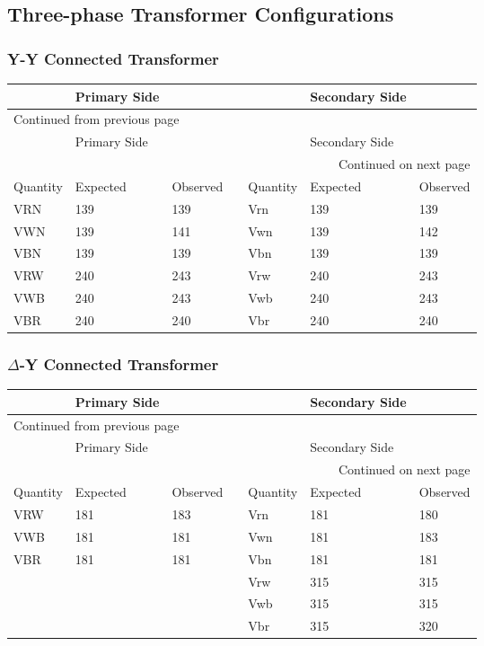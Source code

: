 \documentclass[11pt]{article}
\begin{document}
\subsection{Three-phase Transformer Configurations}
\label{sec:org8ccf199}
\subsubsection{Y-Y Connected Transformer}
\label{sec:org88b83c5}
\begin{longtable}{|l|l|l|l|l|l|l|}
\hline
 & Primary Side &  &  &  & Secondary Side & \\
\hline
\endfirsthead
\multicolumn{7}{l}{Continued from previous page} \\
\hline

 & Primary Side &  &  &  & Secondary Side &  \\

\hline
\endhead
\hline\multicolumn{7}{r}{Continued on next page} \\
\endfoot
\endlastfoot
\hline
Quantity & Expected & Observed &  & Quantity & Expected & Observed\\
\hline
VRN & 139 & 139 &  & Vrn & 139 & 139\\
\hline
VWN & 139 & 141 &  & Vwn & 139 & 142\\
\hline
VBN & 139 & 139 &  & Vbn & 139 & 139\\
\hline
VRW & 240 & 243 &  & Vrw & 240 & 243\\
\hline
VWB & 240 & 243 &  & Vwb & 240 & 243\\
VBR & 240 & 240 &  & Vbr & 240 & 240\\
\hline
\end{longtable}
\subsubsection{\(\Delta\)-Y Connected Transformer}
\label{sec:org7fd7304}
\begin{longtable}{|l|l|l|l|l|l|l|}
\hline
 & Primary Side &  &  &  & Secondary Side & \\
\hline
\endfirsthead
\multicolumn{7}{l}{Continued from previous page} \\
\hline

 & Primary Side &  &  &  & Secondary Side &  \\

\hline
\endhead
\hline\multicolumn{7}{r}{Continued on next page} \\
\endfoot
\endlastfoot
\hline
Quantity & Expected & Observed &  & Quantity & Expected & Observed\\
\hline
VRW & 181 & 183 &  & Vrn & 181 & 180\\
\hline
VWB & 181 & 181 &  & Vwn & 181 & 183\\
\hline
VBR & 181 & 181 &  & Vbn & 181 & 181\\
\hline
 &  &  &  & Vrw & 315 & 315\\
\hline
 &  &  &  & Vwb & 315 & 315\\
\hline
 &  &  &  & Vbr & 315 & 320\\
\hline
\end{longtable}
\end{document}
